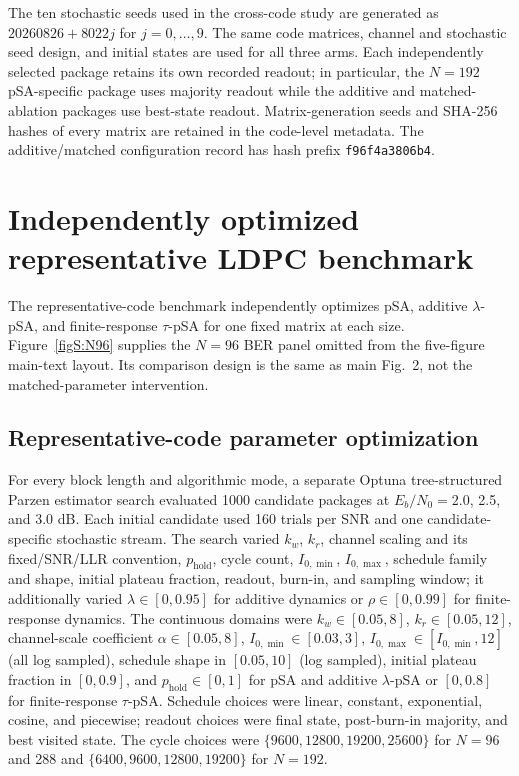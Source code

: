 \documentclass[aps,prapplied,preprint,superscriptaddress,longbibliography,floatfix]{revtex4-2}
\newcommand{\psa}{pSA}
\begin{document}
The ten stochastic seeds used in the cross-code study are generated as $20260826+8022j$ for $j=0,\ldots,9$.  The same code matrices, channel and stochastic seed design, and initial states are used for all three arms.  Each independently selected package retains its own recorded readout; in particular, the $N=192$ pSA-specific package uses majority readout while the additive and matched-ablation packages use best-state readout.  Matrix-generation seeds and SHA-256 hashes of every matrix are retained in the code-level metadata.  The additive/matched configuration record has hash prefix \texttt{f96f4a3806b4}.

\section{Independently optimized representative LDPC benchmark}

The representative-code benchmark independently optimizes \psa{}, additive $\lambda$-pSA, and finite-response $\tau$-pSA for one fixed matrix at each size.  Figure~\ref{figS:N96} supplies the $N=96$ BER panel omitted from the five-figure main-text layout.  Its comparison design is the same as main Fig.~2, not the matched-parameter intervention.

\subsection{Representative-code parameter optimization}

For every block length and algorithmic mode, a separate Optuna tree-structured Parzen estimator search evaluated 1000 candidate packages at $E_b/N_0=2.0$, 2.5, and 3.0 dB.  Each initial candidate used 160 trials per SNR and one candidate-specific stochastic stream.  The search varied $k_w$, $k_r$, channel scaling and its fixed/SNR/LLR convention, $p_{\mathrm{hold}}$, cycle count, $I_{0,\min}$, $I_{0,\max}$, schedule family and shape, initial plateau fraction, readout, burn-in, and sampling window; it additionally varied $\lambda\in[0,0.95]$ for additive dynamics or $\rho\in[0,0.99]$ for finite-response dynamics.  The continuous domains were $k_w\in[0.05,8]$, $k_r\in[0.05,12]$, channel-scale coefficient $\alpha\in[0.05,8]$, $I_{0,\min}\in[0.03,3]$, $I_{0,\max}\in[I_{0,\min},12]$ (all log sampled), schedule shape in $[0.05,10]$ (log sampled), initial plateau fraction in $[0,0.9]$, and $p_{\mathrm{hold}}\in[0,1]$ for \psa{} and additive $\lambda$-pSA or $[0,0.8]$ for finite-response $\tau$-pSA.  Schedule choices were linear, constant, exponential, cosine, and piecewise; readout choices were final state, post-burn-in majority, and best visited state.  The cycle choices were $\{9600,12800,19200,25600\}$ for $N=96$ and 288 and $\{6400,9600,12800,19200\}$ for $N=192$.
\end{document}
